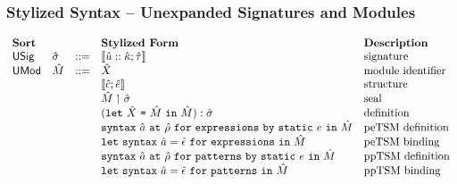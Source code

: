 \subsubsection{Stylized Syntax -- Unexpanded Signatures and Modules}
\[\begin{array}{lllllll}
\textbf{Sort} & & 
& \textbf{Stylized Form} & \textbf{Description}\\
\mathsf{USig} & \usigma & ::= 
& \signature{\uu}{\ukappa}{\utau} & \text{signature}\\
\mathsf{UMod} & \uM & ::= 
& \uX & \text{module identifier}\\
&&
& \struct{\uc}{\ue} & \text{structure}\\
&&
& \seal{\uM}{\usigma} & \text{seal}\\
&&
& \mlet{\uX}{\uM}{\uM}{\usigma} & \text{definition}\\
&&
& \defpetsm{\tsmv}{\urho}{e}{\uM} & \text{peTSM definition}\\
&&
& \uletpetsm{\tsmv}{\uepsilon}{\uM} & \text{peTSM binding}\\
&&
& \defpptsm{\tsmv}{\urho}{e}{\uM} & \text{ppTSM definition}\\
&&
& \uletpptsm{\tsmv}{\uepsilon}{\uM} & \text{ppTSM binding}%
\end{array}\]%

